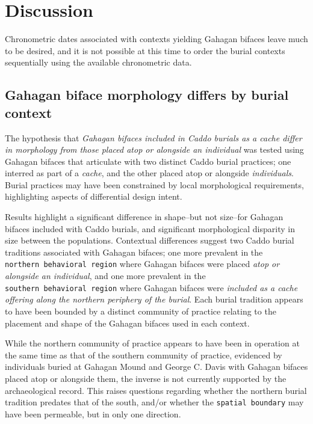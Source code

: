 \documentclass[]{interact}
\theoremstyle{plain}%
\theoremstyle{definition}
\theoremstyle{remark}
\begin{document}
\hypertarget{discussion}{%
\section{Discussion}\label{discussion}}

Chronometric dates associated with contexts yielding Gahagan bifaces
leave much to be desired, and it is not possible at this time to order
the burial contexts sequentially using the available chronometric data.

\hypertarget{gahagan-biface-morphology-differs-by-burial-context}{%
\subsection{Gahagan biface morphology differs by burial
context}\label{gahagan-biface-morphology-differs-by-burial-context}}

The hypothesis that \emph{Gahagan bifaces included in Caddo burials as a
cache differ in morphology from those placed atop or alongside an
individual} was tested using Gahagan bifaces that articulate with two
distinct Caddo burial practices; one interred as part of a \emph{cache},
and the other placed atop or alongside \emph{individuals}. Burial
practices may have been constrained by local morphological requirements,
highlighting aspects of differential design intent.

Results highlight a significant difference in shape--but not size--for
Gahagan bifaces included with Caddo burials, and significant
morphological disparity in size between the populations. Contextual
differences suggest two Caddo burial traditions associated with Gahagan
bifaces; one more prevalent in the \texttt{northern\ behavioral\ region}
where Gahagan bifaces were placed \emph{atop or alongside an
individual}, and one more prevalent in the
\texttt{southern\ behavioral\ region} where Gahagan bifaces were
\emph{included as a cache offering along the northern periphery of the
burial}. Each burial tradition appears to have been bounded by a
distinct community of practice relating to the placement and shape of
the Gahagan bifaces used in each context.

While the northern community of practice appears to have been in
operation at the same time as that of the southern community of
practice, evidenced by individuals buried at Gahagan Mound and George C.
Davis with Gahagan bifaces placed atop or alongside them, the inverse is
not currently supported by the archaeological record. This raises
questions regarding whether the northern burial tradition predates that
of the south, and/or whether the \texttt{spatial\ boundary} may have
been permeable, but in only one direction.
\end{document}
